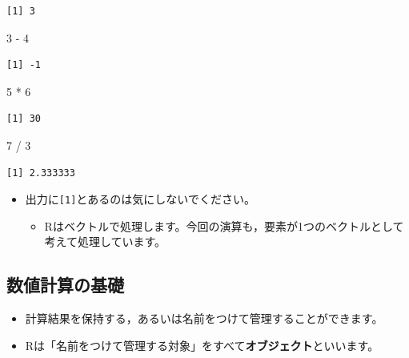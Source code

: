 \documentclass[
  a4paper,
]{ltjsbook}
\newenvironment{Shaded}{\begin{snugshade}}{\end{snugshade}}
\newcommand{\DecValTok}[1]{\textcolor[rgb]{0.68,0.00,0.00}{#1}}
\newcommand{\SpecialCharTok}[1]{\textcolor[rgb]{0.37,0.37,0.37}{#1}}
\providecommand{\tightlist}{%
  \setlength{\itemsep}{0pt}\setlength{\parskip}{0pt}}\usepackage{longtable,booktabs,array}
\begin{document}
\begin{verbatim}
[1] 3
\end{verbatim}

\begin{Shaded}
\begin{Highlighting}[]
\DecValTok{3} \SpecialCharTok{{-}} \DecValTok{4}
\end{Highlighting}
\end{Shaded}

\begin{verbatim}
[1] -1
\end{verbatim}

\begin{Shaded}
\begin{Highlighting}[]
\DecValTok{5} \SpecialCharTok{*} \DecValTok{6}
\end{Highlighting}
\end{Shaded}

\begin{verbatim}
[1] 30
\end{verbatim}

\begin{Shaded}
\begin{Highlighting}[]
\DecValTok{7} \SpecialCharTok{/} \DecValTok{3}
\end{Highlighting}
\end{Shaded}

\begin{verbatim}
[1] 2.333333
\end{verbatim}

\begin{itemize}
\tightlist
\item
  出力に\texttt{{[}1{]}}とあるのは気にしないでください。

  \begin{itemize}
  \tightlist
  \item
    Rはベクトルで処理します。今回の演算も，要素が1つのベクトルとして考えて処理しています。
  \end{itemize}
\end{itemize}

\subsection{数値計算の基礎}\label{ux6570ux5024ux8a08ux7b97ux306eux57faux790e-1}

\begin{itemize}
\tightlist
\item
  計算結果を保持する，あるいは名前をつけて管理することができます。
\item
  Rは「名前をつけて管理する対象」をすべて\textbf{オブジェクト}といいます。
\end{itemize}
\end{document}
